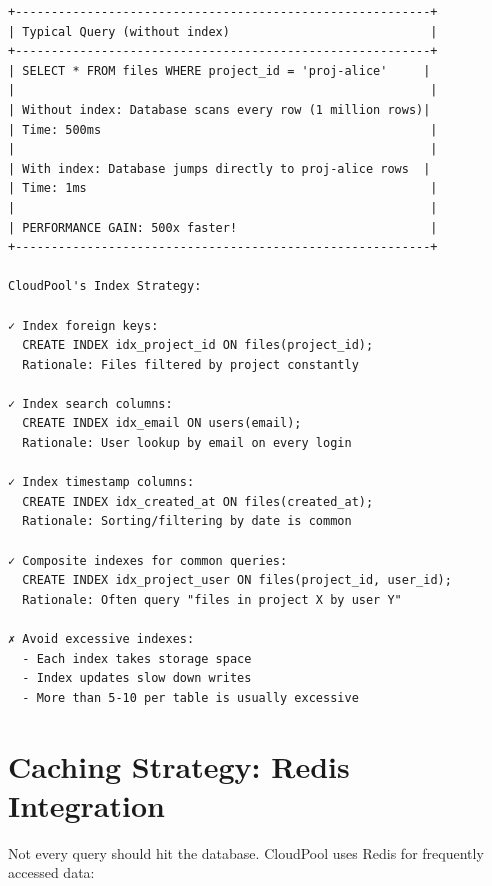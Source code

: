 \documentclass[11pt,a4paper]{report}
\begin{document}
\begin{lstlisting}[language=text]
+----------------------------------------------------------+
| Typical Query (without index)                            |
+----------------------------------------------------------+
| SELECT * FROM files WHERE project_id = 'proj-alice'     |
|                                                          |
| Without index: Database scans every row (1 million rows)|
| Time: 500ms                                              |
|                                                          |
| With index: Database jumps directly to proj-alice rows  |
| Time: 1ms                                                |
|                                                          |
| PERFORMANCE GAIN: 500x faster!                           |
+----------------------------------------------------------+

CloudPool's Index Strategy:

✓ Index foreign keys:
  CREATE INDEX idx_project_id ON files(project_id);
  Rationale: Files filtered by project constantly

✓ Index search columns:
  CREATE INDEX idx_email ON users(email);
  Rationale: User lookup by email on every login

✓ Index timestamp columns:
  CREATE INDEX idx_created_at ON files(created_at);
  Rationale: Sorting/filtering by date is common

✓ Composite indexes for common queries:
  CREATE INDEX idx_project_user ON files(project_id, user_id);
  Rationale: Often query "files in project X by user Y"

✗ Avoid excessive indexes:
  - Each index takes storage space
  - Index updates slow down writes
  - More than 5-10 per table is usually excessive
\end{lstlisting}


\chapter{Caching Strategy: Redis Integration}


Not every query should hit the database. CloudPool uses Redis for frequently accessed data:
\end{document}
